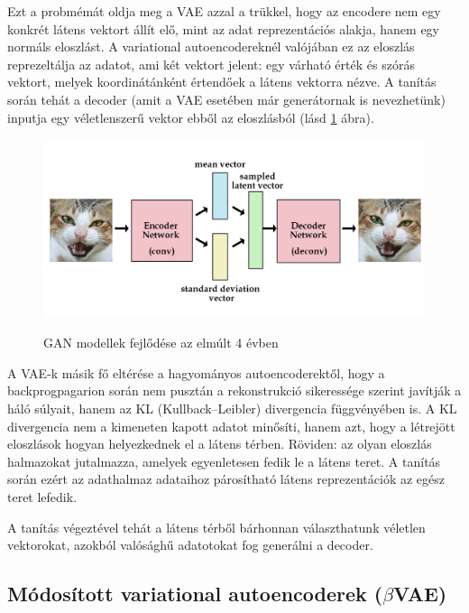 \documentclass[12pt]{article}
\begin{document}
Ezt a probmémát oldja meg a VAE azzal a trükkel, hogy az encodere nem egy konkrét látens vektort állít elő, mint az adat reprezentációs alakja, hanem egy normáls eloszlást. A variational autoencodereknél valójában ez az eloszlás reprezeltálja az adatot, ami két vektort jelent: egy várható érték és szórás vektort, melyek koordinátánként értendőek a látens vektorra nézve. A tanítás során tehát a decoder (amit a VAE esetében már generátornak is nevezhetünk) inputja egy véletlenszerű vektor ebből az eloszlásból (lásd \ref{vae} ábra).

\begin{figure}[h!]
\begin{center}
  \label{vae}
  \includegraphics[width=\linewidth]{vae.jpg}
  \caption{GAN modellek fejlődése az elmúlt 4 évben}
\end{center}
\end{figure}

A VAE-k másik fő eltérése a hagyományos autoencoderektől, hogy a backprogpagarion során nem pusztán a rekonstrukció sikeressége szerint javítják a háló súlyait, hanem az KL (Kullback–Leibler) divergencia függvényében is. A KL divergencia nem a kimeneten kapott adatot minősíti, hanem azt, hogy a létrejött eloszlások hogyan helyezkednek el a látens térben. Röviden: az olyan eloszlás halmazokat jutalmazza, amelyek egyenletesen fedik le a látens teret. A tanítás során ezért az adathalmaz adataihoz párosítható látens reprezentációk az egész teret lefedik.

A tanítás végeztével tehát a látens térből bárhonnan választhatunk véletlen vektorokat, azokból valósághű adatotokat fog generálni a decoder.

\subsection{Módosított variational autoencoderek ($\beta$VAE)}
\end{document}
